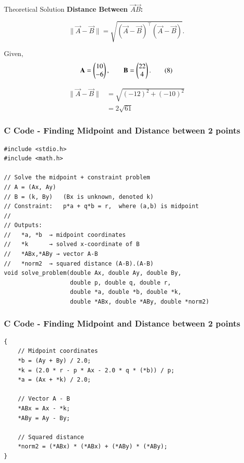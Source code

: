 \documentclass{beamer}
\begin{document}
\begin{frame}{Theoretical Solution}
\textbf{Distance Between \(\vec{A}\vec{B}\):}

\[
\|\vec{A}-\vec{B}\|=\sqrt{(\vec{A}-\vec{B})^{\top}(\vec{A}-\vec{B})}. \tag{7}
\]

Given,
\[
\mathbf{A}=\begin{pmatrix}10\\-6\end{pmatrix},\qquad \mathbf{B}=\begin{pmatrix}22\\4\end{pmatrix}. \tag{8}
\]



\begin{align}
\|\vec{A}-\vec{B}\| &= \sqrt{(-12)^2+(-10)^2} \tag{9} \\
                    &= \boxed{2\sqrt{61}} \tag{10}
\end{align}


\end{frame}


\begin{frame}[fragile]
    \frametitle{C Code - Finding Midpoint and Distance between 2 points}

    \begin{lstlisting}
#include <stdio.h>
#include <math.h>

// Solve the midpoint + constraint problem
// A = (Ax, Ay)
// B = (k, By)   (Bx is unknown, denoted k)
// Constraint:   p*a + q*b = r,  where (a,b) is midpoint
//
// Outputs:
//   *a, *b  → midpoint coordinates
//   *k      → solved x-coordinate of B
//   *ABx,*ABy → vector A-B
//   *norm2  → squared distance (A-B).(A-B)
void solve_problem(double Ax, double Ay, double By,
                   double p, double q, double r,
                   double *a, double *b, double *k,
                   double *ABx, double *ABy, double *norm2)
\end{lstlisting}
\end{frame}

                   \begin{frame}[fragile]
    \frametitle{C Code - Finding Midpoint and Distance between 2 points}

    \begin{lstlisting}
{
    // Midpoint coordinates
    *b = (Ay + By) / 2.0;
    *k = (2.0 * r - p * Ax - 2.0 * q * (*b)) / p;
    *a = (Ax + *k) / 2.0;

    // Vector A - B
    *ABx = Ax - *k;
    *ABy = Ay - By;

    // Squared distance
    *norm2 = (*ABx) * (*ABx) + (*ABy) * (*ABy);
}
\end{lstlisting}
\end{frame}
\end{document}
